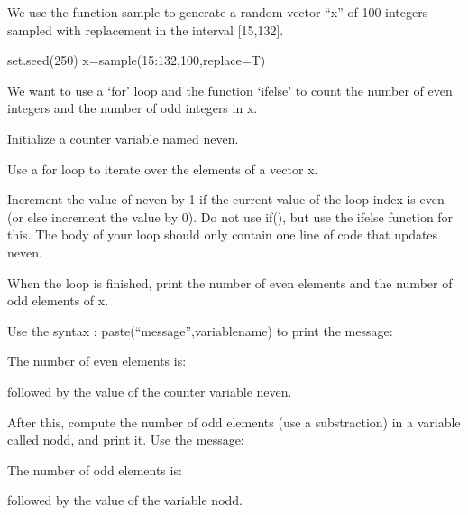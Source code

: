 \documentclass[
]{article}
\newenvironment{Shaded}{\begin{snugshade}}{\end{snugshade}}
\newcommand{\AttributeTok}[1]{\textcolor[rgb]{0.77,0.63,0.00}{#1}}
\newcommand{\DecValTok}[1]{\textcolor[rgb]{0.00,0.00,0.81}{#1}}
\newcommand{\FunctionTok}[1]{\textcolor[rgb]{0.00,0.00,0.00}{#1}}
\newcommand{\NormalTok}[1]{#1}
\newcommand{\OtherTok}[1]{\textcolor[rgb]{0.56,0.35,0.01}{#1}}
\newcommand{\SpecialCharTok}[1]{\textcolor[rgb]{0.00,0.00,0.00}{#1}}
\begin{document}
We use the function sample to generate a random vector ``x'' of 100
integers sampled with replacement in the interval {[}15,132{]}.

\begin{Shaded}
\begin{Highlighting}[]
\FunctionTok{set.seed}\NormalTok{(}\DecValTok{250}\NormalTok{) }
\NormalTok{x}\OtherTok{=}\FunctionTok{sample}\NormalTok{(}\DecValTok{15}\SpecialCharTok{:}\DecValTok{132}\NormalTok{,}\DecValTok{100}\NormalTok{,}\AttributeTok{replace=}\NormalTok{T)}
\end{Highlighting}
\end{Shaded}

We want to use a `for' loop and the function `ifelse' to count the
number of even integers and the number of odd integers in x.

Initialize a counter variable named neven.

Use a for loop to iterate over the elements of a vector x.

Increment the value of neven by 1 if the current value of the loop index
is even (or else increment the value by 0). Do not use if(), but use the
ifelse function for this. The body of your loop should only contain one
line of code that updates neven.

When the loop is finished, print the number of even elements and the
number of odd elements of x.

Use the syntax : paste(``message'',variablename) to print the message:

The number of even elements is:

followed by the value of the counter variable neven.

After this, compute the number of odd elements (use a substraction) in a
variable called nodd, and print it. Use the message:

The number of odd elements is:

followed by the value of the variable nodd.
\end{document}
